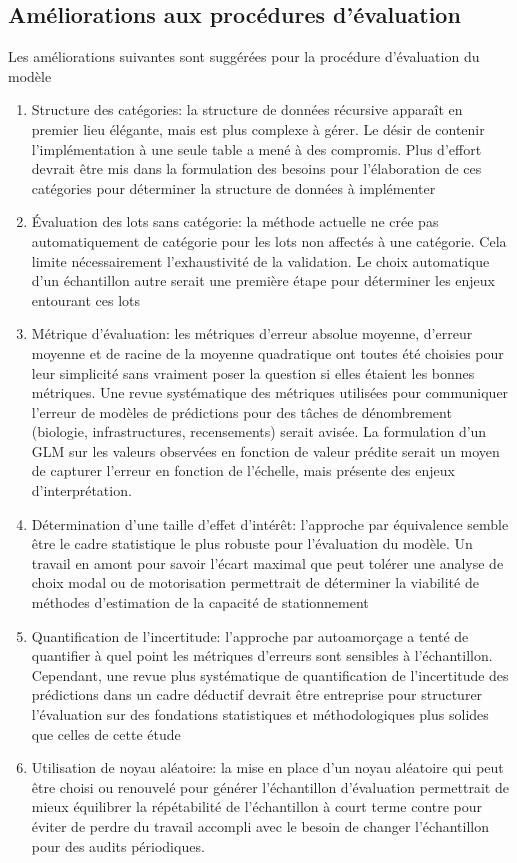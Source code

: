     \subsection{Améliorations aux procédures d'évaluation} 
        Les améliorations suivantes sont suggérées pour la procédure d'évaluation du modèle
        \begin{enumerate}
            \item Structure des catégories: la structure de données récursive apparaît en premier lieu élégante, mais est plus complexe à gérer. Le désir de contenir l'implémentation à une seule table a mené à des compromis. Plus d'effort devrait être mis dans la formulation des besoins pour l'élaboration de ces catégories pour déterminer la structure de données à implémenter 
            \item Évaluation des lots sans catégorie: la méthode actuelle ne crée pas automatiquement de catégorie pour les lots non affectés à une catégorie. Cela limite nécessairement l'exhaustivité de la validation. Le choix automatique d'un échantillon autre serait une première étape pour déterminer les enjeux entourant ces lots
            \item Métrique d'évaluation: les métriques d'erreur absolue moyenne, d'erreur moyenne et de racine de la moyenne quadratique ont toutes été choisies pour leur simplicité sans vraiment poser la question si elles étaient les bonnes métriques. Une revue systématique des métriques utilisées pour communiquer l'erreur de modèles de prédictions pour des tâches de dénombrement (biologie, infrastructures, recensements) serait avisée. La formulation d'un \ac{GLM} sur les valeurs observées en fonction de valeur prédite serait un moyen de capturer l'erreur en fonction de l'échelle, mais présente des enjeux d'interprétation.
            \item Détermination d'une taille d'effet d'intérêt: l'approche par équivalence semble être le cadre statistique le plus robuste pour l'évaluation du modèle. Un travail en amont pour savoir l'écart maximal que peut tolérer une analyse de choix modal ou de motorisation permettrait de déterminer la viabilité de méthodes d'estimation de la capacité de stationnement
            \item Quantification de l'incertitude: l'approche par autoamorçage a tenté de quantifier à quel point les métriques d'erreurs sont sensibles à l'échantillon. Cependant, une revue plus systématique de quantification de l'incertitude des prédictions dans un cadre déductif devrait être entreprise pour structurer l'évaluation sur des fondations statistiques et méthodologiques plus solides que celles de cette étude 
            \item Utilisation de noyau aléatoire: la mise en place d'un noyau aléatoire qui peut être choisi ou renouvelé pour générer l'échantillon d'évaluation permettrait de mieux équilibrer la répétabilité de l'échantillon à court terme contre pour éviter de perdre du travail accompli avec le besoin de changer l'échantillon pour des audits périodiques.
        \end{enumerate}
        \par
        
